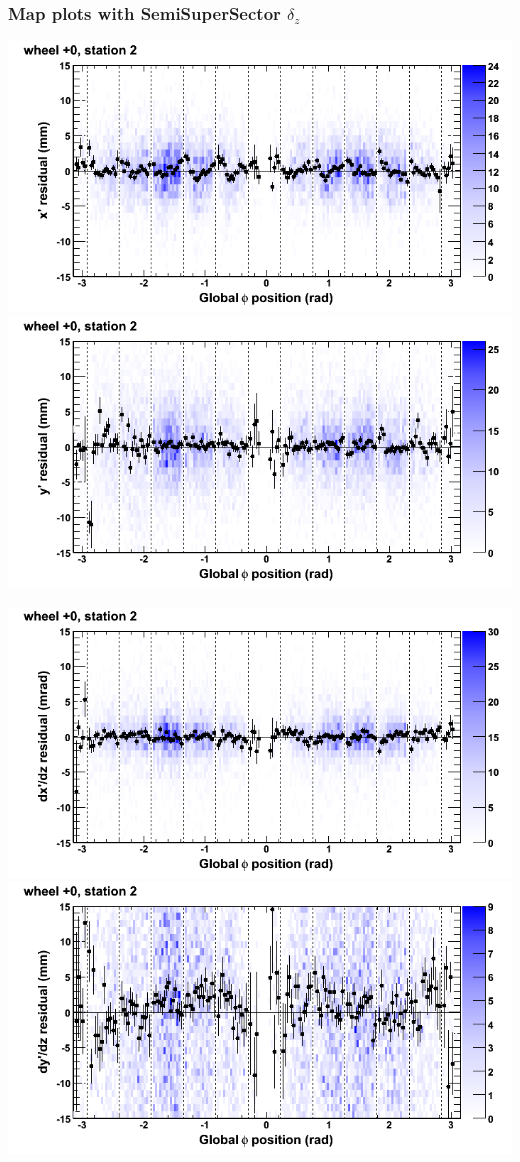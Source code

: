\documentclass[compress]{beamer}
\begin{document}
\begin{frame}
\frametitle{Map plots with SemiSuperSector $\delta_z$}
\includegraphics[width=0.5\linewidth]{zfit_mapplots/DTvsphi_st2whC_x.png}
\includegraphics[width=0.5\linewidth]{zfit_mapplots/DTvsphi_st2whC_y.png}

\includegraphics[width=0.5\linewidth]{zfit_mapplots/DTvsphi_st2whC_dxdz.png}
\includegraphics[width=0.5\linewidth]{zfit_mapplots/DTvsphi_st2whC_dydz.png}
\end{frame}
\end{document}
